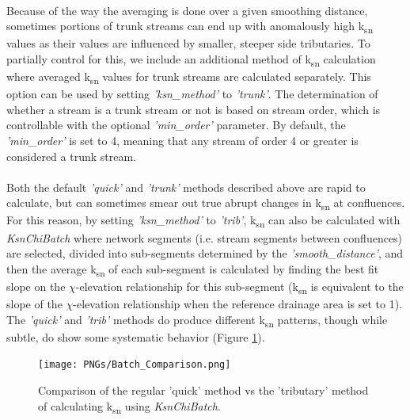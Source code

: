 \paragraph{}Because of the way the averaging is done over a given smoothing distance, sometimes portions of trunk streams can end up with anomalously high k\textsubscript{sn} values as their values are influenced by smaller, steeper side tributaries. To partially control for this, we include an additional method of k\textsubscript{sn} calculation where averaged k\textsubscript{sn} values for trunk streams are calculated separately. This option can be used by setting \textit{'ksn\_method'} to \textit{'trunk'}. The determination of whether a stream is a trunk stream or not is based on stream order, which is controllable with the optional \textit{'min\_order'} parameter. By default, the \textit{'min\_order'} is set to 4, meaning that any stream of order 4 or greater is considered a trunk stream.

\paragraph{}Both the default \textit{'quick'} and \textit{'trunk'} methods described above are rapid to calculate, but can sometimes smear out true abrupt changes in k\textsubscript{sn} at confluences. For this reason, by setting \textit{'ksn\_method'} to \textit{'trib'}, k\textsubscript{sn} can also be calculated with \textit{KsnChiBatch} where network segments (i.e. stream segments between confluences) are selected, divided into sub-segments determined by the \textit{'smooth\_distance'}, and then the average k\textsubscript{sn} of each sub-segment is calculated by finding the best fit slope on the $\chi$-elevation relationship for this sub-segment (k\textsubscript{sn} is equivalent to the slope of the $\chi$-elevation relationship when the reference drainage area is set to 1). The \textit{'quick'} and \textit{'trib'} methods do produce different k\textsubscript{sn} patterns, though while subtle, do show some systematic behavior (Figure \ref{fig:BatchComp}).

\begin{figure}[H]
	\texttt{[image: PNGs/Batch\_Comparison.png]}
	\caption{Comparison of the regular 'quick' method vs the 'tributary' method of calculating k\textsubscript{sn} using \textit{KsnChiBatch}.}
	\label{fig:BatchComp}
\end{figure}

